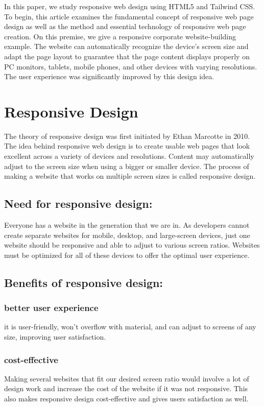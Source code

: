 \documentclass[conference]{IEEEtran}
\begin{document}
In this paper, we study responsive web design using HTML5 and Tailwind CSS. To begin, this article examines the fundamental concept of responsive web page design as well as the method and essential technology of responsive web page creation. On this premise, we give a responsive corporate website-building example. The website can automatically recognize the device's screen size and adapt the page layout to guarantee that the page content displays properly on PC monitors, tablets, mobile phones, and other devices with varying resolutions. The user experience was significantly improved by this design idea.
 

\section{Responsive Design}
{The theory of responsive design was first initiated by Ethan Marcotte in 2010. The idea behind responsive web design is to create usable web pages that look excellent across a variety of devices and resolutions. Content may automatically adjust to the screen size when using a bigger or smaller device. The process of making a website that works on multiple screen sizes is called responsive design.}
\subsection{Need for responsive design:}

{Everyone has a website in the generation that we are in. As developers cannot create separate websites for mobile, desktop, and large-screen devices, just one website should be responsive and able to adjust to various screen ratios. Websites must be optimized for all of these devices to offer the optimal user experience.}

\subsection{Benefits of responsive design:}

\subsubsection{\textbf{better user experience}} it is user-friendly, won't overflow with material, and can adjust to screens of any size, improving user satisfaction.

\subsubsection{\textbf{cost-effective}}Making several websites that fit our desired screen ratio would involve a lot of design work and increase the cost of the website if it was not responsive. This also makes responsive design cost-effective and gives users satisfaction as well.
\end{document}
